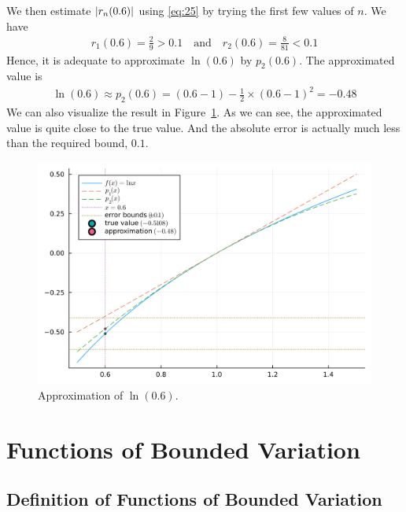 \documentclass[thmcnt=section, 12pt]{my-elegantbook}
\begin{document}
\begin{solution}
    \par We then estimate $\left\lvert r_n(0.6) \right\rvert$ using \eqref{eq:25} by trying the first few values of $n$. We have 
    \begin{align*}
        r_1(0.6) = \frac{2}{9} > 0.1
        \quad \text{and} \quad 
        r_2(0.6) = \frac{8}{81} < 0.1
    \end{align*}
    Hence, it is adequate to approximate $\ln(0.6)$ by $p_2(0.6)$. The approximated value is
    \begin{align*}
        \ln(0.6) \approx p_2(0.6) = (0.6-1) - \frac{1}{2} \times (0.6-1)^2 = -0.48
    \end{align*}
    We can also visualize the result in Figure~\ref{fig:8}. As we can see, the approximated value is quite close to the true value. And the absolute error is actually much less than the required bound, $0.1$.
    \begin{figure}[ht]
        \centering
        \includegraphics[scale=0.2]{figures/taylor-approx.png}
        \caption{Approximation of $\ln(0.6)$.}
        \label{fig:8}
    \end{figure}
\end{solution}


\chapter{Functions of Bounded Variation}


\section{Definition of Functions of Bounded Variation}
\end{document}
